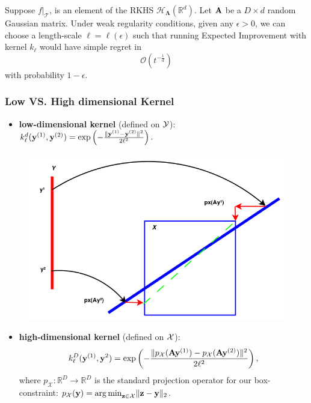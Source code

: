 \documentclass[grey]{beamer}
\begin{document}
  \begin{frame}
  \begin{theorem}\label{thm:regret}
   Suppose $f|_\mathcal T$, is an element of the RKHS 
   $\mathcal H_{\mathbf{\Lambda}}(\mathbb R^d)$.
   Let $\mathbf{A}$ be a $D \times d$ random Gaussian matrix. 
   Under weak regularity conditions, given any $\epsilon > 0$, we can choose a length-scale $\ell = \ell(\epsilon)$ such that running Expected Improvement with kernel $k_{\ell}$ would have simple regret in $$\mathcal O(t^{-\frac{1}{d}})$$ with probability $1-\epsilon$.
\end{theorem}

 \end{frame}
 
 \begin{frame}
  \frametitle{Low VS. High dimensional Kernel}
  \begin{minipage}[l]{0.56\columnwidth}
    \begin{itemize}
    \small
   \item {\bf \textcolor{myColor}{low-dimensional kernel}} (defined on 
   {\bf \textcolor{myColor}{$\cal Y$}}):\\
   $k_{\ell}^d(\mathbf{y}^{(1)},\mathbf{y}^{(2)}) = \exp\left({-\frac{\|\mathbf{y}^{(1)}-\mathbf{y}^{(2)}\|^2}{2\ell^2}}\right). $
  \end{itemize}
  \end{minipage}
 \begin{minipage}[r]{0.42\columnwidth}
  \begin{figure}
  \begin{flushright}
   \includegraphics[width=1\columnwidth]{./figs/low_high_dim.png}
   \end{flushright}
  \end{figure}
 \end{minipage}
 \begin{itemize}
 \small
  \item {\bf \textcolor{myColor}{high-dimensional kernel}} (defined on 
   {\bf \textcolor{myColor}{$\cal X$}}):  
  $$k_{\ell}^D(\mathbf{y}^{(1)}, \mathbf{y}^2) = \exp\left( -\frac{\| p_{\mathcal{X}}(\mathbf{A}\mathbf{y}^{(1)}) - p_{\mathcal{X}}(\mathbf{A}\mathbf{y}^{(2)}) \|^2}{2\ell^2} \right),$$
  where $p_{\mathcal{X}}:\mathbb{R}^D \rightarrow \mathbb{R}^D$ is the standard projection operator for our box-constraint: $p_{\mathcal{X}}(\mathbf{y}) = {\arg \min}_{\mathbf{z}\in \mathcal{X}} \|\mathbf{z}-\mathbf{y}\|_2$. 
  \end{itemize}
 \end{frame}
\end{document}
